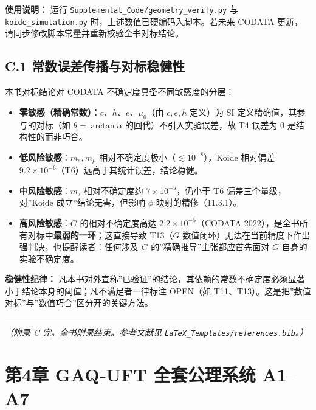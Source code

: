 \textbf{使用说明：} 运行 \texttt{Supplemental\_Code/geometry\_verify.py}
与 \texttt{koide\_simulation.py} 时，上述数值已硬编码入脚本。若未来
CODATA 更新，请同步修改脚本常量并重新校验全书对标结论。

\subsection{C.1
常数误差传播与对标稳健性}\label{c.1-ux5e38ux6570ux8befux5deeux4f20ux64adux4e0eux5bf9ux6807ux7a33ux5065ux6027}

本书对标结论对 CODATA 不确定度具备不同敏感度的分层：

\begin{itemize}
\tightlist
\item
  \textbf{零敏感（精确常数）}：\(c\)、\(h\)、\(e\)、\(\mu_0\)（由
  \(c,e,h\) 定义）为 SI 定义精确值，其参与的对标（如
  \(\theta=\arctan\alpha\) 的回代）不引入实验误差，故 T4 误差为 0
  是结构性的而非巧合。
\item
  \textbf{低风险敏感}：\(m_e,m_\mu\)
  相对不确定度极小（\(\lesssim10^{-8}\)），Koide 相对偏差
  \(9.2\times10^{-6}\)（T6）远高于其统计误差，结论稳健。
\item
  \textbf{中风险敏感}：\(m_\tau\) 相对不确定度约
  \(7\times10^{-5}\)，仍小于 T6 偏差三个量级，对''Koide
  成立''结论无害，但影响 \(\phi\) 映射的精修（11.3.1）。
\item
  \textbf{高风险敏感}：\(G\) 的相对不确定度高达
  \(2.2\times10^{-5}\)（CODATA‑2022），是全书所有对标中\textbf{最弱的一环}；这直接导致
  T13（\(G\) 数值闭环）无法在当前精度下作出强判决，也提醒读者：任何涉及
  \(G\) 的''精确推导''主张都应首先面对 \(G\) 自身的实验不确定度。
\end{itemize}

\textbf{稳健性纪律：}
凡本书对外宣称''已验证''的结论，其依赖的常数不确定度必须显著小于结论本身的阈值；凡不满足者一律标注
OPEN（如 T11、T13）。这是把''数值对标''与''数值巧合''区分开的关键方法。

\begin{center}\rule{0.5\linewidth}{0.5pt}\end{center}

\emph{（附录 C 完。全书附录结束。参考文献见
\texttt{LaTeX\_Templates/references.bib}。）}

\section{第4章 GAQ‑UFT 全套公理系统
A1--A7}\label{ux7b2c4ux7ae0-gaquft-ux5168ux5957ux516cux7406ux7cfbux7edf-a1a7-1}

